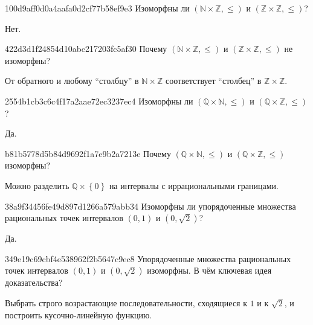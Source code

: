 \begin{note}{100d9aff0d0a4aafa0d2cf77b58ef9e3}
    Изоморфны ли \({ (\mathbb N \times \mathbb Z, \leqslant) }\) и \({ (\mathbb Z \times \mathbb Z, \leqslant) }\)?

    \begin{cloze}{1}
        Нет.
    \end{cloze}
\end{note}

\begin{note}{422d3d1f24854d10abc217203fc5af30}
    Почему \({ (\mathbb N \times \mathbb Z, \leqslant) }\) и \({ (\mathbb Z \times \mathbb Z, \leqslant) }\) не изоморфны?

    \begin{cloze}{1}
        От обратного и любому ``столбцу'' в \({ \mathbb N \times \mathbb Z }\) соответствует ``столбец'' в \({ \mathbb Z \times \mathbb Z }\).
    \end{cloze}
\end{note}

\begin{note}{2554b1cb3c6c4f17a2aae72ec3237ec4}
    Изоморфны ли \({ (\mathbb Q \times \mathbb N, \leqslant) }\) и \({ (\mathbb Q \times \mathbb Z, \leqslant) }\)?

    \begin{cloze}{1}
        Да.
    \end{cloze}
\end{note}

\begin{note}{b81b5778d5b84d9692f1a7e9b2a7213e}
    Почему \({ (\mathbb Q \times \mathbb N, \leqslant) }\) и \({ (\mathbb Q \times \mathbb Z, \leqslant) }\) изоморфны?

    \begin{cloze}{1}
        Можно разделить \({ \mathbb Q \times \left\{ 0 \right\} }\) на интервалы с иррациональными границами.
    \end{cloze}
\end{note}

\begin{note}{38a9f34456fe49d897d1266a579abb34}
    Изоморфны ли упорядоченные множества рациональных точек интервалов \({ (0, 1) }\) и \({ (0, \sqrt{2}) }\)?

    \begin{cloze}{1}
        Да.
    \end{cloze}
\end{note}

\begin{note}{349e19c69cbf4e538962f2b5647c9ec8}
    Упорядоченные множества рациональных точек интервалов \({ (0, 1) }\) и \({ (0, \sqrt{2}) }\) изоморфны.
    В чём ключевая идея доказательства?

    \begin{cloze}{1}
        Выбрать строго возрастающие последовательности, сходящиеся к \({ 1 }\) и к \({ \sqrt{2} }\), и построить кусочно-линейную функцию.
    \end{cloze}
\end{note}

